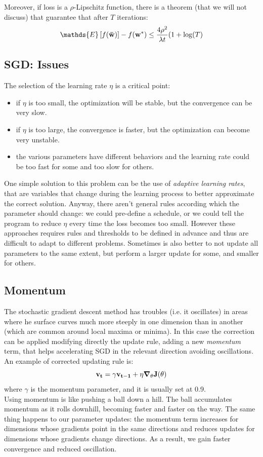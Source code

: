 \documentclass[12pt]{report}
\theoremstyle{plain}
\newcommand\EV[1]{\mathds{E}\left[{#1}\right]}
\begin{document}
\begin{flushleft}
Moreover, if loss is a $\rho$-Lipschitz function, there is a theorem (that we will not discuss) that guarantee that after $T$ iterations:
\[ \EV{f(\vb{\bar{w}})}-f(\vb{w^*})\leq\frac{4\rho^2}{\lambda t}(1+\log(T) \]

\subsection*{SGD: Issues}
 The selection of the learning rate $\eta$ is a critical point:
\begin{itemize}
	\item if $\eta$ is too small, the optimization will be stable, but the convergence can be very slow.
	\item if $\eta$ is too large, the convergence is faster, but the optimization can become very unstable.
	\item the various parameters have different behaviors and the learning rate could be too fast for some and too slow for others.
\end{itemize}
One simple solution to this problem can be the use of \textit{adaptive learning rates}, that are variables that change during the learning process to better approximate the correct solution. Anyway, there aren't general rules according which the parameter should change: we could pre-define a schedule, or we could tell the program to reduce $\eta$ every time the loss becomes too small. However these approaches requires rules and thresholds to be defined in advance and thus are difficult to adapt to different problems. Sometimes is also better to not update all parameters to the same extent, but perform a larger update for some, and smaller for others.

\subsection*{Momentum}
The stochastic gradient descent method has troubles (i.e. it oscillates) in areas where he surface curves much more steeply in one dimension than in another (which are common around local maxima or minima). In this case the correction can be applied modifying directly the update rule, adding a new \textit{momentum} term, that helps accelerating SGD in the relevant direction avoiding oscillations. An example of corrected updating rule is:
\[ \vb{v_t} = \gamma\vb{v_{t-1}}+\eta\grad_\theta{\vb{J}(\theta)} \]
where $\gamma$ is the momentum parameter, and it is usually set at 0.9.\\
Using momentum is like pushing a ball down a hill. The ball accumulates momentum as it rolls downhill, becoming faster and faster on the way. The same thing happens to our parameter updates: the momentum term increases for dimensions whose gradients point in the same directions and reduces updates for dimensions whose gradients change directions. As a result, we gain faster convergence and reduced oscillation.


\end{flushleft}
\end{document}
